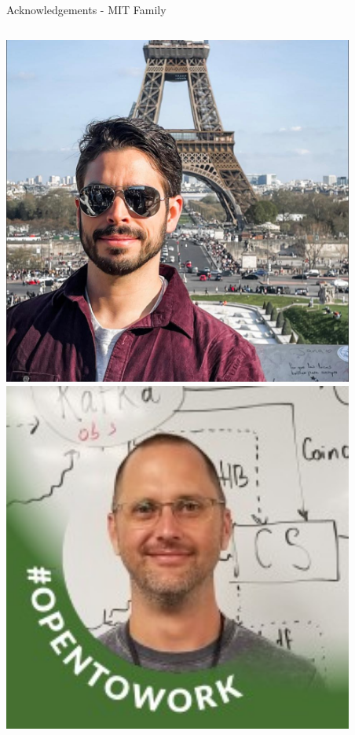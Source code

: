 \documentclass[aspectratio=169]{beamer}
\begin{document}
\begin{frame}{Acknowledgements - MIT Family }
     \begin{columns}
                \centering
                \includegraphics[width=0.865\textwidth]{people/band/rey.png}
                \includegraphics[width=0.865\textwidth]{people/band/smolsky.png}
                

\end{columns}
\end{frame}
\end{document}
